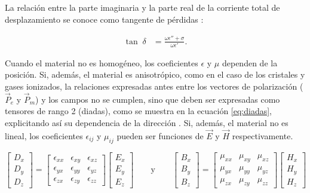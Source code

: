 La relación entre la parte imaginaria y la parte real de la corriente total de desplazamiento se conoce como tangente de pérdidas \cite{Pozar:MwEngineering}:

\begin{align}
	\tan \; \delta &= \frac{\omega \epsilon'' + \sigma}{\omega \epsilon'}.
\end{align}

Cuando el material no es homogéneo, los coeficientes $\epsilon$ y $\mu$ dependen de la posición. Si, además, el material es anisotrópico, como en el caso de los cristales y gases ionizados, la relaciones expresadas antes entre los vectores de polarización ($\vec{P}_e$ y $\vec{P}_m$) y los campos no se cumplen, sino que deben ser expresadas como tensores de rango 2 (diadas), como se muestra en la ecuación \ref{eq:diadas}, explicitando así su dependencia de la dirección \cite{Collin:GuidedWaves}. Si, además, el material no es lineal, los coeficientes $\epsilon_{ij}$ y $\mu_{ij}$ pueden ser funciones de $\vec{E}$ y $\vec{H}$ respectivamente.

\begin{equation} \label{eq:diadas}
\begin{bmatrix}
D_x \\
D_y \\
D_z
\end{bmatrix}
=
\begin{bmatrix}
\epsilon_{xx} & \epsilon_{xy} & \epsilon_{xz} \\
\epsilon_{yx} & \epsilon_{yy} & \epsilon_{yz} \\
\epsilon_{zx} & \epsilon_{zy} & \epsilon_{zz}
\end{bmatrix}
\begin{bmatrix}
E_x \\
E_y \\
E_z
\end{bmatrix}
\qquad\text{y}\qquad
\begin{bmatrix}
B_x \\
B_y \\
B_z
\end{bmatrix}
=
\begin{bmatrix}
\mu_{xx} & \mu_{xy} & \mu_{xz} \\
\mu_{yx} & \mu_{yy} & \mu_{yz} \\
\mu_{zx} & \mu_{zy} & \mu_{zz}
\end{bmatrix}
\begin{bmatrix}
H_x \\
H_y \\
H_z
\end{bmatrix}
\end{equation}

